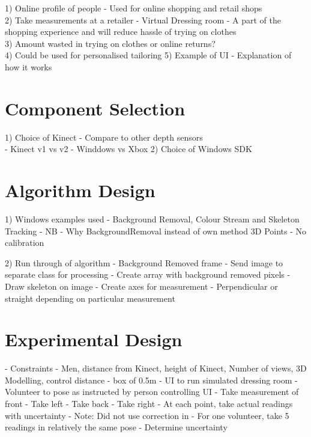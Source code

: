 1) Online profile of people - Used for online shopping and retail shops\\
2) Take measurements at a retailer - Virtual Dressing room - A part of the shopping experience and will reduce hassle of trying on clothes\\
3) Amount wasted in trying on clothes or online returns?\\
4) Could be used for personalised tailoring
5) Example of UI - Explanation of how it works

\section{Component Selection}
1) Choice of Kinect - Compare to other depth sensors\\
- Kinect v1 vs v2
- Winddows vs Xbox
2) Choice of Windows SDK\\

\section{Algorithm Design}
1) Windows examples used - Background Removal, Colour Stream and Skeleton Tracking - NB - Why BackgroundRemoval instead of own method
3D Points - No calibration

2) Run through of algorithm
- Background Removed frame
- Send image to separate class for processing
- Create array with background removed pixels
- Draw skeleton on image
- Create axes for measurement - Perpendicular or straight depending on particular measurement

\section{Experimental Design}
- Constraints - Men, distance from Kinect, height of Kinect, Number of views, 3D Modelling, control distance - box of 0.5m
- UI to run simulated dressing room
- Volunteer to pose as instructed by person controlling UI
- Take measurement of front
- Take left
- Take back
- Take right 
- At each point, take actual readings with uncertainty
- Note: Did not use correction in \cite{nonContact2017}
- For one volunteer, take 5 readings in relatively the same pose - Determine uncertainty 